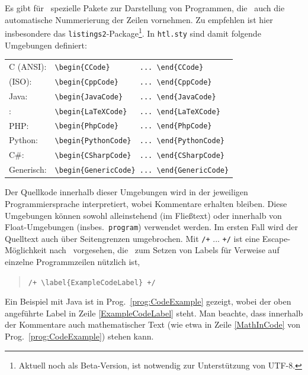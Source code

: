 Es gibt für \latex\ spezielle Pakete zur Darstellung von Programmen, die \ua\
auch die automatische Nummerierung der Zeilen vornehmen. Zu empfehlen ist hier
insbesondere das \texttt{listings2}-Package\footnote{Aktuell noch als
Beta-Version, ist notwendig zur Unterstützung von UTF-8.}. In \texttt{htl.sty}
sind damit folgende Umgebungen definiert:
%
\begin{center}
\begin{tabular}{ll}
C (ANSI):   & \verb!\begin{CCode}       ... \end{CCode}! \\
\cpp (ISO):  & \verb!\begin{CppCode}     ... \end{CppCode}! \\
Java:       & \verb!\begin{JavaCode}    ... \end{JavaCode}! \\
\latex:     & \verb!\begin{LaTeXCode}   ... \end{LaTeXCode}! \\
PHP:  		& \verb!\begin{PhpCode}     ... \end{PhpCode}! \\
Python:  	& \verb!\begin{PythonCode}  ... \end{PythonCode}! \\
C\#:  		& \verb!\begin{CSharpCode}  ... \end{CSharpCode}! \\
Generisch:  & \verb!\begin{GenericCode} ... \end{GenericCode}! 
\end{tabular}
\end{center}
%
Der Quellkode innerhalb dieser Umgebungen wird in der jeweiligen Programmiersprache interpretiert, wobei Kommentare erhalten bleiben. Diese Umgebungen können sowohl alleinstehend (im Fließtext) oder innerhalb von Float-Umgebungen (insbes.\ \texttt{program}) verwendet werden. Im ersten Fall wird der Quelltext auch über Seitengrenzen umgebrochen. Mit \verb!/+! ... \verb!+/! ist eine Escape-Möglichkeit nach \latex\ vorgesehen, die \va\ zum Setzen von Labels für Verweise auf einzelne Programmzeilen nützlich ist, \zB
%
\begin{quote}
\verb!/+ \label{ExampleCodeLabel} +/!
\end{quote}
%
Ein Beispiel mit Java ist in Prog.~\ref{prog:CodeExample} gezeigt, wobei der oben angeführte Label in Zeile \ref{ExampleCodeLabel} steht.
Man beachte, dass innerhalb der Kommentare auch mathematischer Text (wie etwa in Zeile \ref{MathInCode} von Prog.~\ref{prog:CodeExample}) stehen kann.

